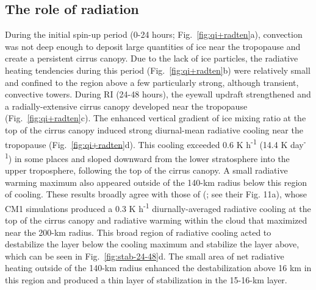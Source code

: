  \subsection{The role of radiation}
During the initial spin-up period (0-24 hours; Fig.~\ref{fig:qi+radten}a), convection was not deep enough to deposit large quantities of ice near the tropopause and create a persistent cirrus canopy.
Due to the lack of ice particles, the radiative heating tendencies during this period (Fig.~\ref{fig:qi+radten}b) were relatively small and confined to the region above a few particularly strong, although transient, convective towers.
During RI (24-48 hours), the eyewall updraft strengthened and a radially-extensive cirrus canopy developed near the tropopause (Fig.~\ref{fig:qi+radten}c).
The enhanced vertical gradient of ice mixing ratio at the top of the cirrus canopy induced strong diurnal-mean radiative cooling near the tropopause (Fig.~\ref{fig:qi+radten}d).
This cooling exceeded 0.6 K h\textsuperscript{-1} (14.4 K day\textsuperscript{-1}) in some places and sloped downward from the lower stratosphere into the upper troposphere, following the top of the cirrus canopy.
A small radiative warming maximum also appeared outside of the 140-km radius below this region of cooling.
These results broadly agree with those of \citeauthor{Buetal2014} (\citeyear{Buetal2014}; see their Fig. 11a), whose CM1 simulations produced a 0.3 K h\textsuperscript{-1} diurnally-averaged radiative cooling at the top of the cirrus canopy and radiative warming within the cloud that maximized near the 200-km radius.
This broad region of radiative cooling acted to destabilize the layer below the cooling maximum and stabilize the layer above, which can be seen in Fig.~\ref{fig:stab-24-48}d.
The small area of net radiative heating outside of the 140-km radius enhanced the destabilization above 16 km in this region and produced a thin layer of stabilization in the 15-16-km layer.


